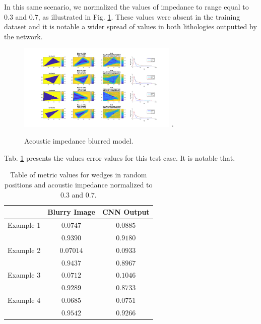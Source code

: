 \documentclass[conference,compsoc]{IEEEtran}
\begin{document}
In this same scenario, we normalized the values of impedance to  range equal to $0.3$ and $0.7$, as
illustrated in Fig. \ref{fig_scenario3}. These values were absent in the training dataset and it
is notable a wider spread of values in both lithologies outputted by the network.
\begin{figure}[!t]
\centering
\includegraphics[width=3.0in]{Figs/Caso3}
\DeclareGraphicsExtensions.
\caption{Acoustic impedance blurred model.}
\label{fig_scenario3}
\end{figure}

Tab. \ref{table_caso_7} presents the values error values for this test case. It is notable
that.
\begin{table}[!t]
\renewcommand{\arraystretch}{1.3}
\caption{Table of metric values for wedges in random positions and acoustic impedance normalized to $0.3$ and $0.7$.}
\label{table_caso_7}
\centering
\begin{tabular}{|c||c||c|}
\hline
 & Blurry Image & CNN Output \\
\hline
Example 1 & $0.0747$ & $0.0885$\\
\hline
	  & $0.9390$ & $0.9180$\\
\hline
Example 2 & $0.07014$ & $0.0933$ \\
\hline
	  & $0.9437$ & $0.8967$\\
\hline
Example 3 & $0.0712$ & $0.1046$\\
\hline
	  & $0.9289$ & $0.8733$\\
\hline
Example 4 & $0.0685$ & $0.0751$\\
\hline
	  & $0.9542$ & $0.9266$\\
\hline
\end{tabular}
\end{table}

\end{document}
